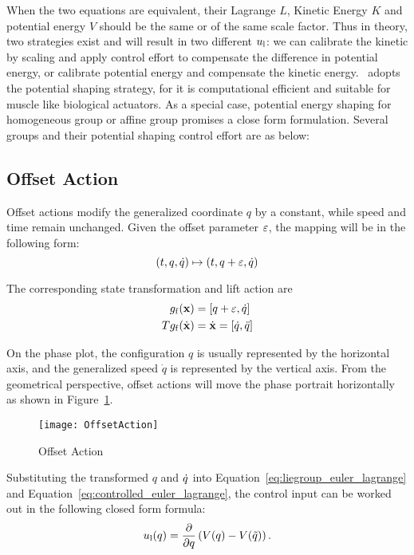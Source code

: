 When the two equations are equivalent, their Lagrange $L$, Kinetic Energy $K$ and potential energy $V$ should be the same or of the same scale factor.
Thus in theory, two strategies exist and will result in two different $u_{\mathrm{l}}$:
we can calibrate the kinetic by scaling and apply control effort to compensate the difference in potential energy, or calibrate potential energy and compensate the kinetic energy.
\moit\ adopts the potential shaping strategy, for it is computational efficient and suitable for muscle like biological actuators.
As a special case, potential energy shaping for homogeneous group or affine group promises a close form formulation.
Several groups and their potential shaping control effort are as below:



\subsection*{ Offset Action}
Offset actions  modify the generalized coordinate $q$ by a constant, while speed and time remain unchanged.
Given the offset parameter $\varepsilon$, the mapping will be in the following form:
\[
(t,q,\dot{q}) \mapsto (t,q+\varepsilon,\dot{q})
\]

The corresponding state transformation and lift action are
\begin{align}
g_{\mathrm{f}}(\mathbf{x}) &= [q+\varepsilon,\dot{q}] \\
Tg_{\mathrm{f}}(\dot{\mathbf{x}})&=\dot{\mathbf{x}}=[\dot{q},\ddot{q}]
\end{align}


On the phase plot,  the configuration $q$ is usually represented by the horizontal axis, and the generalized speed $\dot{q}$ is represented by the vertical axis.
From the geometrical perspective, offset actions will move the phase portrait horizontally as shown in Figure~\ref{fig:goff}.

\begin{figure}[!htbp]
  \begin{center}
      \texttt{[image: OffsetAction]}
    \caption{Offset Action}
    \label{fig:goff}
\end{center}
\end{figure}

Substituting the transformed $q$ and $\dot{q}$ into Equation~\ref{eq:liegroup_euler_lagrange} and Equation~\ref{eq:controlled_euler_lagrange},
the control input  can be worked out in the following closed form formula:
\begin{equation}
u_{\mathrm{l}}(q) = \frac{\partial}{\partial q} \left(V(q)-V(\tilde{q}) \right).
\end{equation}

